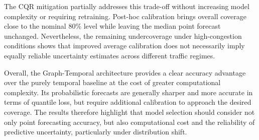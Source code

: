 The CQR mitigation partially addresses this trade-off without increasing
model complexity or requiring retraining. Post-hoc calibration brings overall
coverage close to the nominal 80\% level while leaving the median point
forecast unchanged. Nevertheless, the remaining undercoverage under
high-congestion conditions shows that improved average calibration does not
necessarily imply equally reliable uncertainty estimates across different
traffic regimes.

Overall, the Graph-Temporal architecture provides a clear accuracy advantage
over the purely temporal baseline at the cost of greater computational
complexity. Its probabilistic forecasts are generally sharper and more
accurate in terms of quantile loss, but require additional calibration to
approach the desired coverage. The results therefore highlight that model
selection should consider not only point forecasting accuracy, but also
computational cost and the reliability of predictive uncertainty,
particularly under distribution shift.

